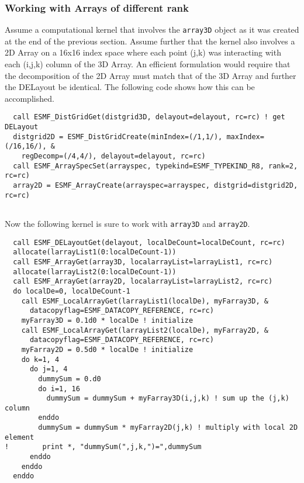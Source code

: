 
 
   \subsubsection{Working with Arrays of different rank}
   Assume a computational kernel that involves the {\tt array3D} object as it was
   created at the end of the previous section. Assume further that the kernel 
   also involves a 2D Array on a 16x16 index space where each point (j,k) was
   interacting with each (i,j,k) column of the 3D Array. An efficient formulation
   would require that the decomposition of the 2D Array must match that of the 3D
   Array and further the DELayout be identical. The following code shows how this
   can be accomplished. 

 \begin{verbatim}
  call ESMF_DistGridGet(distgrid3D, delayout=delayout, rc=rc) ! get DELayout
  distgrid2D = ESMF_DistGridCreate(minIndex=(/1,1/), maxIndex=(/16,16/), &
    regDecomp=(/4,4/), delayout=delayout, rc=rc)
  call ESMF_ArraySpecSet(arrayspec, typekind=ESMF_TYPEKIND_R8, rank=2, rc=rc)
  array2D = ESMF_ArrayCreate(arrayspec=arrayspec, distgrid=distgrid2D, rc=rc)
 
\end{verbatim}
 

   Now the following kernel is sure to work with {\tt array3D} and {\tt array2D}. 

 \begin{verbatim}
  call ESMF_DELayoutGet(delayout, localDeCount=localDeCount, rc=rc)
  allocate(larrayList1(0:localDeCount-1))
  call ESMF_ArrayGet(array3D, localarrayList=larrayList1, rc=rc)
  allocate(larrayList2(0:localDeCount-1))
  call ESMF_ArrayGet(array2D, localarrayList=larrayList2, rc=rc)
  do localDe=0, localDeCount-1
    call ESMF_LocalArrayGet(larrayList1(localDe), myFarray3D, &
      datacopyflag=ESMF_DATACOPY_REFERENCE, rc=rc)
    myFarray3D = 0.1d0 * localDe ! initialize
    call ESMF_LocalArrayGet(larrayList2(localDe), myFarray2D, &
      datacopyflag=ESMF_DATACOPY_REFERENCE, rc=rc)
    myFarray2D = 0.5d0 * localDe ! initialize
    do k=1, 4
      do j=1, 4
        dummySum = 0.d0
        do i=1, 16
          dummySum = dummySum + myFarray3D(i,j,k) ! sum up the (j,k) column
        enddo
        dummySum = dummySum * myFarray2D(j,k) ! multiply with local 2D element
!        print *, "dummySum(",j,k,")=",dummySum
      enddo
    enddo
  enddo
 
\end{verbatim}
 
